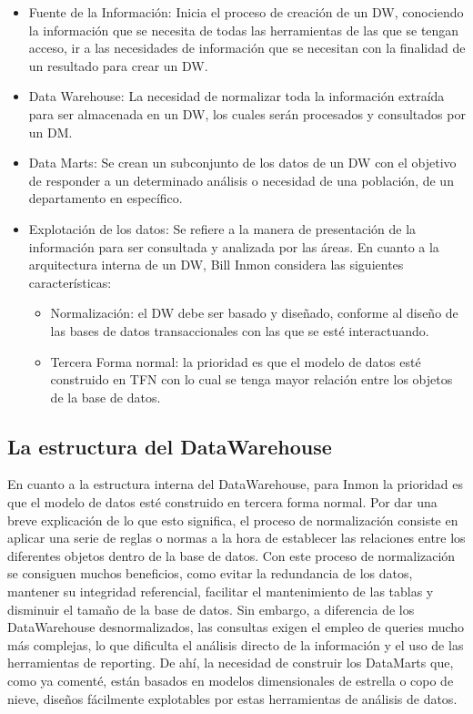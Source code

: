 \documentclass[%
 reprint,
 amsmath,amssymb,
 aps,
]{revtex4-1}
\begin{document}
\begin{itemize}
		\item Fuente de la Información: Inicia el proceso de creación de un DW, conociendo la información que se necesita de todas las herramientas de las que se tengan acceso, ir a las necesidades de información que se necesitan con la finalidad de un resultado para crear un DW.

		\item Data Warehouse: La necesidad de normalizar toda la información extraída para ser almacenada en un DW, los cuales serán procesados y consultados por un DM.
		\item Data Marts: Se crean un subconjunto de los datos de un DW con el objetivo de responder a un determinado análisis o necesidad de una población, de un departamento en específico.
		\item Explotación de los datos: Se refiere a la manera de presentación de la información para ser consultada y analizada por las áreas. En cuanto a la arquitectura interna de un DW, Bill Inmon considera las siguientes características:

			\begin{itemize}
				\item Normalización: el DW debe ser basado y diseñado, conforme al diseño de las bases de datos transaccionales con las que se esté interactuando.
				\item Tercera Forma normal: la prioridad es que el modelo de datos esté construido en TFN con lo cual se tenga mayor relación entre los objetos de la base de datos.
			\end{itemize}

\end{itemize}

\subsection{La estructura del DataWarehouse}	
En cuanto a la estructura interna del DataWarehouse, para Inmon la prioridad es que el modelo de datos esté construido en tercera forma normal. Por dar una breve explicación de lo que esto significa, el proceso de normalización consiste en aplicar una serie de reglas o normas a la hora de establecer las relaciones entre los diferentes objetos dentro de la base de datos. Con este proceso de normalización se consiguen muchos beneficios, como evitar la redundancia de los datos, mantener su integridad referencial, facilitar el mantenimiento de las tablas y disminuir el tamaño de la base de datos. Sin embargo, a diferencia de los DataWarehouse desnormalizados, las consultas exigen el empleo de queries mucho más complejas, lo que dificulta el análisis directo de la información y el uso de las herramientas de reporting. De ahí, la necesidad de construir los DataMarts que, como ya comenté, están basados en modelos dimensionales de estrella o copo de nieve, diseños fácilmente explotables por estas herramientas de análisis de datos.\cite{aquino}
\end{document}
